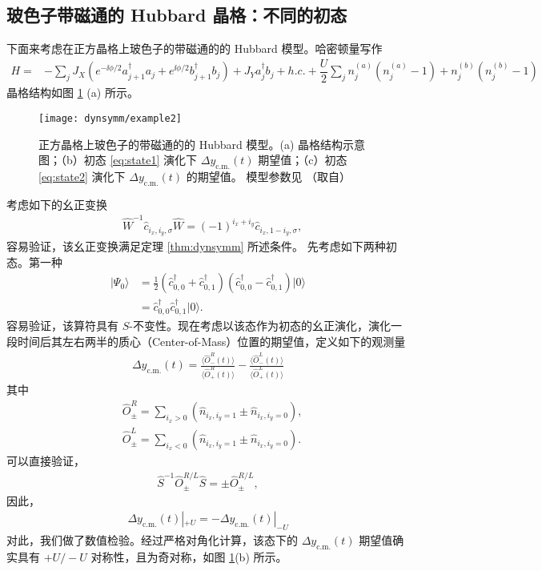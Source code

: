 \subsection{玻色子带磁通的 Hubbard 晶格：不同的初态}
下面来考虑在正方晶格上玻色子的带磁通的的 Hubbard 模型\cite{twobody-2017}。哈密顿量写作
\begin{align}
H=&-\sum_jJ_X(e^{-\ii\phi/2}a^{\dagger}_{j+1}a_j+e^{\ii\phi/2}b^{\dagger}_{j+1}b_j)+J_Ya_j^{\dagger}b_j+h.c. 
+\dfrac{U}{2}\sum_jn_j^{(a)}(n_j^{(a)}-1)+n_j^{(b)}(n_j^{(b)}-1)
\end{align}
晶格结构如图 \ref{fig:dynm:fluxladder} (a) 所示。
\begin{figure}[!htb]
\centering
\texttt{[image: dynsymm/example2]}
\caption{正方晶格上玻色子的带磁通的的 Hubbard 模型。(a) 晶格结构示意图；（b）初态 \ref{eq:state1} 演化下 $\Delta y_{\text{c.m.}}(t)$ 期望值；（c）初态 \ref{eq:state2} 演化下 $\Delta y_{\text{c.m.}}(t)$ 的期望值。 模型参数见 （取自）}
\label{fig:dynm:fluxladder}
\end{figure}
考虑如下的幺正变换
\begin{align}
&\hat{W}^{-1}\hat{c}_{i_x,i_y,\sigma}\hat{W}=(-1)^{i_x+i_y}\hat{c}_{i_x,1-i_y,\sigma},  \label{W2} 
\end{align}
容易验证，该幺正变换满足定理 \ref{thm:dynsymm} 所述条件\cite{dynsymm}。
先考虑如下两种初态。第一种
\begin{align}\label{eq:state1}
|\Psi_0\rangle&=\frac{1}{2}(\hat{c}^\dag_{0,0}+\hat{c}^\dag_{0,1})(\hat{c}^\dag_{0,0}-\hat{c}^\dag_{0,1})|0\rangle\nonumber\\
&=\hat{c}^\dag_{0,0}\hat{c}^\dag_{0,1}|0\rangle.
\end{align}
容易验证，该算符具有 $S$-不变性。现在考虑以该态作为初态的幺正演化，演化一段时间后其左右两半的质心（Center-of-Mass）位置的期望值，定义如下的观测量
\begin{align}
\Delta y_{\text{c.m.}}(t)=\frac{\langle \hat{O}^R_{-}(t)\rangle}{\langle \hat{O}^R_{+}(t)\rangle}-\frac{\langle \hat{O}^L_{-}(t)\rangle}{\langle \hat{O}^L_{+}(t)\rangle}
\end{align}
其中
\begin{align}
&\hat{O}^R_{\pm}=\sum\limits_{i_x>0}(\hat{n}_{i_x,i_y=1}\pm \hat{n}_{i_x,i_y=0}), \\
&\hat{O}^L_{\pm}=\sum\limits_{i_x<0}(\hat{n}_{i_x,i_y=1}\pm \hat{n}_{i_x,i_y=0}). 
\end{align}
可以直接验证，
\begin{align}
\hat{S}^{-1}\hat{O}^{R/L}_{\pm}\hat{S}=\pm \hat{O}^{R/L}_{\pm},
\end{align}
因此，
\begin{align}
\Delta y_{\text{c.m.}}(t)|_{+U}=-\Delta y_{\text{c.m.}}(t)|_{-U}
\end{align}
对此，我们做了数值检验。经过严格对角化计算，该态下的 $\Delta y_{\text{c.m.}}(t)$ 期望值确实具有 $+U/-U$ 对称性，且为奇对称，如图 \ref{fig:dynm:fluxladder}(b) 所示。

